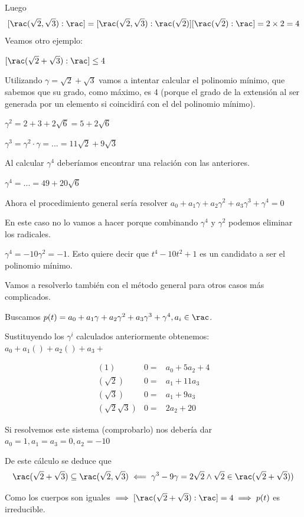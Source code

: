 \documentclass{apuntes}
\begin{document}
Luego \[[\rac(\sqrt{2},\sqrt{3}): \rac] = [\rac(\sqrt{2},\sqrt{3}): \rac(\sqrt{2})] [\rac(\sqrt{2}): \rac] = 2 \times 2 =  4\]
\newpage
Veamos otro ejemplo:
\begin{example}
$[\rac(\sqrt{2} + \sqrt{3}) : \rac] \leq 4$

Utilizando $\gamma = \sqrt{2} + \sqrt{3}$ vamos a intentar calcular el polinomio mínimo, que sabemos que su grado, como máximo, es 4 (porque el grado de la extensión al ser generada por un elemento si coincidirá con el del polinomio mínimo).

$\gamma^2 = 2+3+2\sqrt{6} = 5 + 2\sqrt{6}$

$\gamma^3 = \gamma^2 · \gamma = ... = 11 \sqrt{2} + 9\sqrt{3} $

Al calcular $\gamma^4$ deberíamos encontrar una relación con las anteriores.

$\gamma^4 = ... = 49 + 20\sqrt{6}$


Ahora el procedimiento general sería resolver $a_0 + a_1\gamma + a_2 \gamma^2 + a_3\gamma^3 + \gamma^4 = 0$

En este caso no lo vamos a hacer porque combinando $\gamma^4$ y $\gamma^2$ podemos eliminar los radicales.

$\gamma^4 = -10 \gamma^2 = -1$. Esto quiere decir que $t^4 - 10t^2 + 1$ es un candidato a ser el polinomio mínimo.

Vamos a resolverlo también con el método general para otros casos más complicados.

Buscamos $p(t) = a_0+a_1\gamma+a_2\gamma^2 + a_3\gamma^3 + \gamma^4, a_i\in\rac$.

Sustituyendo  los $\gamma^i$ calculados anteriormente obtenemos: $a_0 + a_1() + a_2() + a_3 + $

\[
\begin{array}{ccc}
(1) & 0 =& a_0 + 5a_2 + 4\\
(\sqrt{2}) & 0 =& a_1 + 11a_3\\
(\sqrt{3}) & 0 =& a_1 + 9a_3\\
(\sqrt{2}\sqrt{3}) & 0 =& 2a_2 + 20
\end{array}
\]

Si resolvemos este sistema (comprobarlo) nos debería dar $a_0 = 1, a_1=a_3=0,a_2 = -10$
\end{example}
\begin{corol}
De este cálculo se deduce que \[\rac(\sqrt{2} + \sqrt{3}) \subseteq \rac(\sqrt{2},\sqrt{3}) \impliedby \gamma^3 - 9\gamma = 2\sqrt{2} \wedge \sqrt{2}\in\rac(\sqrt{2} + \sqrt{3}))\]

Como los cuerpos son iguales $\implies [\rac(\sqrt{2}+\sqrt{3}) : \rac] = 4 \implies p(t)$ es irreducible.
\end{corol}
\end{document}
